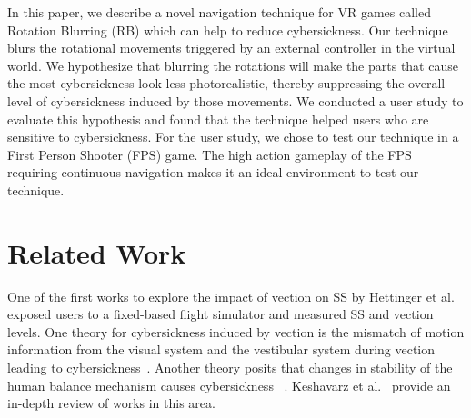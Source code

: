 \documentclass{vgtc}                          %
\begin{document}
In this paper, we describe a novel navigation technique for VR games called Rotation Blurring (RB) which can help to reduce cybersickness. Our technique blurs the rotational movements triggered by an external controller in the virtual world. We hypothesize that blurring the rotations will make the parts that cause the most cybersickness look less photorealistic, thereby suppressing the overall level of cybersickness induced by those movements. We conducted a user study to evaluate this hypothesis and found that the technique helped users who are sensitive to cybersickness. For the user study, we chose to test our technique in a First Person Shooter (FPS) game. The high action gameplay of the FPS requiring continuous navigation makes it an ideal environment to test our technique. 


\section{Related Work}

One of the first works to explore the impact of vection on SS by Hettinger et al.~\cite{hettinger1990vection} exposed users to a fixed-based flight simulator and measured SS and vection levels. One theory for cybersickness induced by vection is the mismatch of motion information from the visual system and the vestibular system during vection leading to cybersickness~\cite{oman1990motion}. Another theory posits that changes in stability of the human balance mechanism causes cybersickness ~\cite{riccio1991ecological}. Keshavarz et al.~\cite{Keshavarz2015} provide an in-depth review of works in this area.
\end{document}
